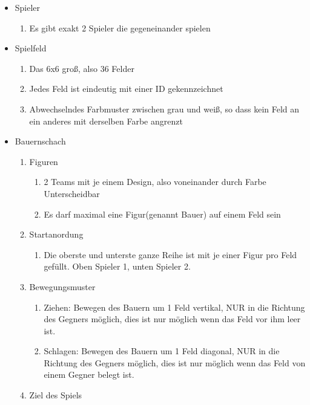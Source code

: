 \documentclass[14pt]{scrartcl}
\begin{document}
\begin{itemize}
    \item Spieler
    \begin{enumerate}
        \item Es gibt exakt 2 Spieler die gegeneinander spielen
    \end{enumerate}
    \item Spielfeld
    \begin{enumerate}
        \item Das 6x6 groß, also 36 Felder
        \item  Jedes Feld ist eindeutig mit einer ID gekennzeichnet
        \item  Abwechselndes Farbmuster zwischen grau und weiß, so dass kein Feld an     
        ein anderes mit derselben Farbe angrenzt
    \end{enumerate}
    \item Bauernschach
    \begin{enumerate}
        \item Figuren
        \begin{enumerate}
            \item 2 Teams mit je einem Design, also voneinander durch Farbe Unterscheidbar
            \item Es darf maximal eine Figur(genannt Bauer) auf einem Feld sein
        \end{enumerate}
        \item Startanordung
        \begin{enumerate}
            \item Die oberste und unterste  ganze Reihe ist mit je einer Figur pro Feld gefüllt. Oben Spieler 1, unten Spieler 2.
        \end{enumerate}
        \item  Bewegungsmuster
        \begin{enumerate}
            \item Ziehen: Bewegen des Bauern um 1 Feld vertikal, NUR in die Richtung des 
            Gegners möglich, dies ist nur möglich wenn das Feld vor ihm leer ist.
            \item Schlagen: Bewegen des Bauern um 1 Feld diagonal, NUR in die Richtung des
            Gegners möglich, dies ist nur möglich wenn das Feld von einem Gegner belegt ist.
        \end{enumerate}
        \item  Ziel des Spiels
        \begin{enumerate}

\end{enumerate}
\end{enumerate}
\end{itemize}
\end{document}
